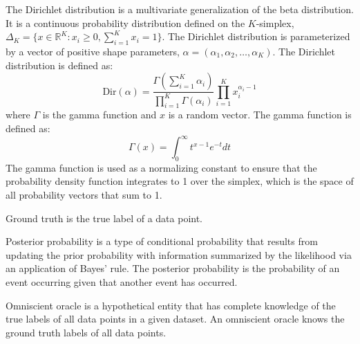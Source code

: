 \begin{defn}
\label{def:dirichlet_distribution}
The Dirichlet distribution is a multivariate generalization of the beta distribution. It is a continuous probability distribution defined on the \(K\)-simplex, \(\Delta_K = \{x \in \mathbb{R}^K: x_i \geq 0, \sum_{i=1}^K x_i = 1\}\). The Dirichlet distribution is parameterized by a vector of positive shape parameters, \(\alpha = (\alpha_1, \alpha_2, \dots, \alpha_K)\). The Dirichlet distribution is defined as:
\[\text{Dir}(\alpha) = \frac{\Gamma(\sum_{i=1}^K \alpha_i)}{\prod_{i=1}^K \Gamma(\alpha_i)}\prod_{i=1}^K x_i^{\alpha_i - 1}\]
where \(\Gamma\) is the gamma function and \(x\) is a random vector. The gamma function is defined as:
\[\Gamma(x) = \int_0^\infty t^{x - 1}e^{-t}dt\]
The gamma function is used as a normalizing constant to ensure that the probability density function integrates to 1 over the simplex, which is the space of all probability vectors that sum to 1.
\end{defn}

\begin{defn}
\label{def:ground_truth}
Ground truth is the true label of a data point.
\end{defn}

\begin{defn}
\label{def:posterior_probabilities}
Posterior probability is a type of conditional probability that results from updating the prior probability with information summarized by the likelihood via an application of Bayes' rule. The posterior probability is the probability of an event occurring given that another event has occurred.
\end{defn}

\begin{defn}
\label{def:omniscient_oracles}
Omniscient oracle is a hypothetical entity that has complete knowledge of the true labels of all data points in a given dataset. An omniscient oracle knows the ground truth labels of all data points.
\end{defn}

